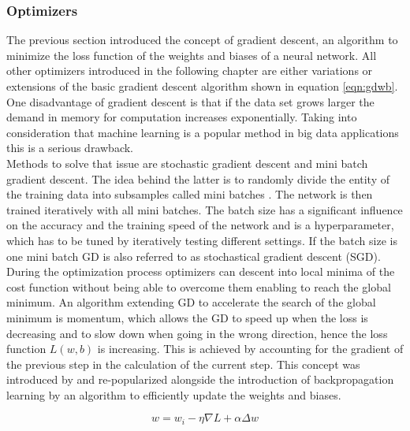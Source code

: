 \subsubsection{Optimizers}
The previous section introduced the concept of gradient descent, an algorithm to minimize the loss
function of the weights and biases of a neural network. All other optimizers introduced in
the following chapter are either variations or extensions of the basic gradient descent algorithm shown in equation \ref{eqn:gdwb}. \\
One disadvantage of gradient descent is that if the data set grows larger the demand in memory for
computation increases exponentially. Taking into consideration that machine learning is a
popular method in big data applications this is a serious drawback.\\
Methods to solve that issue are stochastic gradient descent and mini batch gradient descent.  The
idea behind the latter is to randomly divide the entity of the training data into subsamples called
mini batches \cite{bottou-bousquet-2008}. The network is then trained iteratively with all mini
batches. The batch size has a significant influence on the accuracy and the training speed of the
network and is a hyperparameter, which has to be tuned by iteratively testing different settings. If
the batch size is one mini batch GD is also referred to as stochastical gradient descent (SGD). \\
During the optimization process optimizers can descent into local minima of the cost function
without being able to overcome them enabling to reach the global minimum. An algorithm extending GD
to accelerate the search of the global minimum is momentum, which allows the GD to speed up when the
loss is decreasing and to slow down when going in the wrong direction, hence the loss function
$L(w,b)$ is increasing. This is achieved by accounting for the gradient of the previous step in the
calculation of the current step. This concept was introduced by \cite{polyak1964} and re-popularized
alongside the introduction of backpropagation learning by \cite{rumelhart1988learning} an algorithm
to efficiently update the weights and biases.

\begin{equation}
 w = w_i - \eta \nabla L + \alpha \Delta w
 \label{eqn:momentum}
\end{equation}

